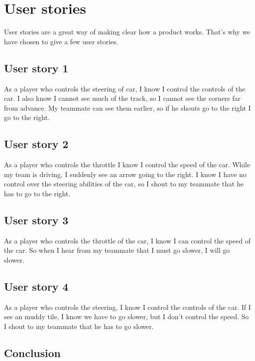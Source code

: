 \documentclass{article}
\begin{document}
\section{User stories}
User stories are a great way of making clear how a product works. That's why we have chosen to give a few user stories. 

\subsection{User story 1}
As a player who controls the steering of car, I know I control the controls of the car. I also know I cannot see much of the track, so I cannot see the corners far from advance. My teammate can see them earlier, so if he shouts go to the right I go to the right.

\subsection{User story 2}
As a player who controls the throttle I know I control the speed of the car. While my team is driving, I suddenly see an arrow going to the right. I know I have no control over the steering abilities of the car, so I shout to my teammate that he has to go to the right.

\subsection{User story 3}
As a player who controls the throttle of the car, I know I can control the speed of the car. So when I hear from my teammate that I must go slower, I will go slower.

\subsection{User story 4}
As a player who controls the steering, I know I control the controls of the car. If I see an muddy tile, I know we have to go slower, but I don't control the speed. So I shout to my teammate that he has to go slower.

\subsection{Conclusion}
\end{document}
